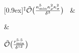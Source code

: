 \begin{table}[t]
\begin{tabular}
{{    [0.9ex]\hspace{-1mm}$^\ddag\tilde{{\mathcal{O}}}\big(\frac{\kappa_{\rm min}^5\kappa_\rho^2\kappa_\sigma^2}{\delta^3}\big)$~\cite{Liu2024geometricmean}}}
    & \parbox[c][5em][c]{6em}{\centering {}}
    & \parbox[c][5em][c]{6em}{\centering $\tilde{{\mathcal{O}}}\big(\frac{r_{\rm min}^{5.5}}{\delta^{12}}\big)$~\cite{gilyen2022improvedfidelity}}
    \\ 
\end{tabular}
\label{tab:fidelity}
\end{table}
\renewcommand{\arraystretch}{1.0}














